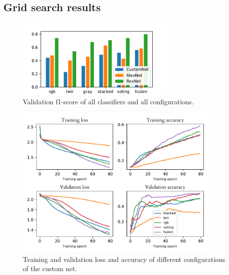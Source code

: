 \documentclass{l4proj}
\begin{document}
\begin{appendices}

\chapter{Grid search results}
\label{appendix_grid_search}

\begin{figure}[ht]
  \centering
  \includegraphics[width=0.7\textwidth]{images/evaluation/gridsearch/comparison}
  \caption{Validation f1-score of all classifiers and all configurations.}
  \label{fig:gridsearch_bar}
\end{figure}

\begin{figure}[ht]
  \centering
  \includegraphics[width=0.9\textwidth]{images/evaluation/gridsearch/CustomNet}
  \caption{Training and validation loss and accuracy of different configurations of the custom net.}
  \label{fig:customnet_configs}
\end{figure}


\end{appendices}
\end{document}
